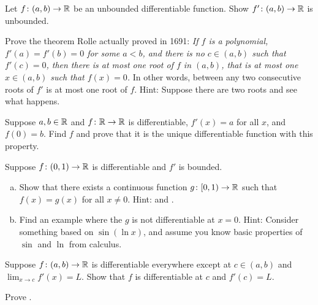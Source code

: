\begin{exercise}
Let $f \colon (a,b) \to {\mathbb{R}}$ be an unbounded differentiable function.  Show
$f' \colon (a,b) \to {\mathbb{R}}$ is unbounded.
\end{exercise}

\begin{exercise}
Prove the theorem Rolle actually proved in 1691:
\emph{If $f$ is a polynomial,
$f'(a) = f'(b) = 0$ for some $a < b$,
and there is no $c \in (a,b)$ such that $f'(c) = 0$,
then there is at most one root of $f$ in $(a,b)$,
that is at most one $x \in (a,b)$ such that $f(x) = 0$.}
In other words, between any two consecutive roots of $f'$ is at most one
root of $f$.
Hint: Suppose there are two roots and see what happens.
\end{exercise}

\begin{exercise}
Suppose $a,b \in {\mathbb{R}}$ and $f \colon {\mathbb{R}} \to {\mathbb{R}}$ is differentiable,
$f'(x) = a$ for all $x$, and $f(0) = b$.  Find $f$ and prove that 
it is the unique differentiable function with this property.
\end{exercise}

\begin{exercise} \label{exercise:extendboundedder}
Suppose $f \colon (0,1) \to {\mathbb{R}}$ is differentiable and $f'$
is bounded.
\begin{enumerate}[a)]
\item
Show that there exists a continuous function $g \colon [0,1) \to {\mathbb{R}}$
such that $f(x) = g(x)$ for all $x \not= 0$.  Hint:  and
.
\item
Find an example where the $g$ is not differentiable at $x=0$.
Hint: Consider something based on $\sin(\ln x)$,
and assume you know basic properties of
$\sin$ and $\ln$ from calculus.
\end{enumerate}
\end{exercise}

\begin{exercise}
Suppose $f \colon (a,b) \to {\mathbb{R}}$ is differentiable everywhere except at $c \in
(a,b)$ and $\lim_{x \to c} f'(x) = L$.  Show that $f$ is differentiable at
$c$ and $f'(c) = L$.
\end{exercise}

\begin{exercise}
Prove .
\end{exercise}


